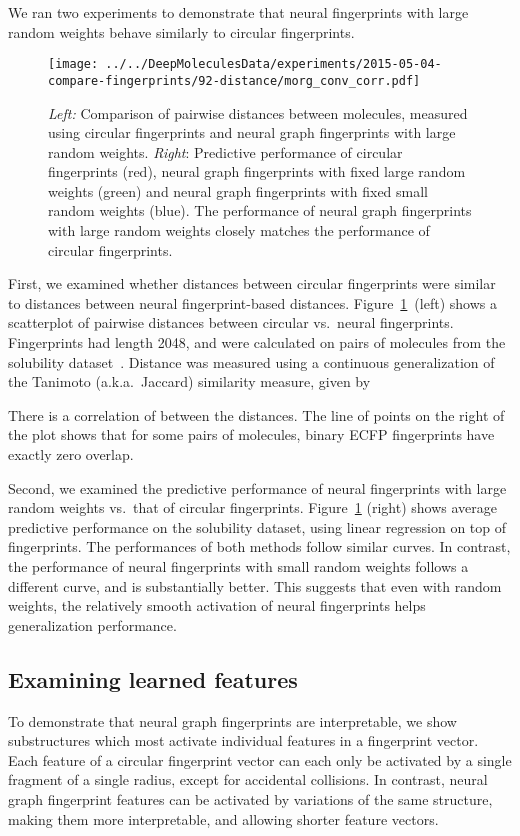 \documentclass{article}
\newcommand{\citet}{\cite}
\begin{document}
We ran two experiments to demonstrate that neural fingerprints with large random weights behave similarly to circular fingerprints.
\begin{figure}[h]
\texttt{[image: ../../DeepMoleculesData/experiments/2015-05-04-compare-fingerprints/92-distance/morg\_conv\_corr.pdf]}
\caption{\emph{Left:} Comparison of pairwise distances between molecules, measured using circular fingerprints and neural graph fingerprints with large random weights.
\emph{Right}: Predictive performance of circular fingerprints (red), neural graph fingerprints with fixed large random weights (green) and neural graph fingerprints with fixed small random weights (blue).
The performance of neural graph fingerprints with large random weights closely matches the performance of circular fingerprints.}
\label{fig:fingerprint similarity}
\end{figure}
First, we examined whether distances between circular fingerprints were similar to distances between neural fingerprint-based distances.
Figure~\ref{fig:fingerprint similarity}~(left) shows a scatterplot of pairwise distances between circular vs.\ neural fingerprints.
Fingerprints had length 2048, and were calculated on pairs of molecules from the solubility dataset~\citet{delaney_data_2004}.
Distance was measured using a continuous generalization of the Tanimoto (a.k.a.\ Jaccard) similarity measure, given by

There is a correlation of  between the distances.
The line of points on the right of the plot shows that for some pairs of molecules, binary ECFP fingerprints have exactly zero overlap.

Second, we examined the predictive performance of neural fingerprints with large random weights vs.\ that of  circular fingerprints.
Figure~\ref{fig:fingerprint similarity} (right) shows average predictive performance on the solubility dataset, using linear regression on top of fingerprints.
The performances of both methods follow similar curves. In contrast, the performance of neural fingerprints with small random weights follows a different curve, and is substantially better.
This suggests that even with random weights, the relatively smooth activation of neural fingerprints helps generalization performance.

\subsection{Examining learned features}
To demonstrate that neural graph fingerprints are interpretable, we show substructures which most activate individual features in a fingerprint vector.
Each feature of a circular fingerprint vector can each only be activated by a single fragment of a single radius, except for accidental collisions.
In contrast, neural graph fingerprint features can be activated by variations of the same structure, making them more interpretable, and allowing shorter feature vectors.
\end{document}
